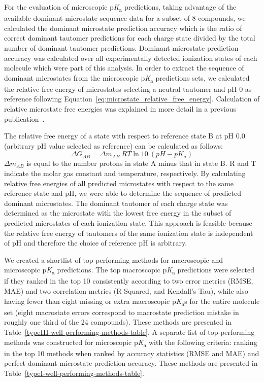 \documentclass[9pt,lineno,final]{elife}
\newcommand{\pKa}{p\textit{K}\textsubscript{a}}
\begin{document}
For the evaluation of microscopic \pKa{} predictions, taking advantage of the available dominant microstate sequence data for a subset of 8 compounds, we calculated the dominant microstate prediction accuracy which is the ratio of correct dominant tautomer predictions for each charge state divided by the total number of dominant tautomer predictions. 
Dominant microstate prediction accuracy was calculated over all experimentally detected ionization states of each molecule which were part of this analysis. 
In order to extract the sequence of dominant microstates from the microscopic \pKa{} predictions sets, we calculated the relative free energy of microstates selecting a neutral tautomer and pH 0 as reference following Equation~\ref{eq:microstate_relative_free_energy}. 
Calculation of relative microstate free energies was explained in more detail in a previous publication~\citep{Gunner:2020:J.Comput.AidedMol.Des.}. 

The relative free energy of a state with respect to reference state B at pH 0.0 (arbitrary pH value selected as reference) can be calculated as follows: 
\begin{equation}
\Delta G_{AB} = \Delta m_{AB} \:RT\ln{10}\:(pH - pK_{a})
\label{eq:microstate_relative_free_energy}
\end{equation}
$\Delta m_{AB}$ is equal to the number protons in state A minus that in state B. R and T indicate the molar gas constant and temperature, respectively. 
By calculating relative free energies of all predicted microstates with respect to the same reference state and pH, we were able to determine the sequence of predicted dominant microstates. 
The dominant tautomer of each charge state was determined as the microstate with the lowest free energy in the subset of predicted microstates of each ionization state. 
This approach is feasible because the relative free energy of tautomers of the same ionization state is independent of pH and therefore the choice of reference pH is arbitrary.

We created a shortlist of top-performing methods for macroscopic and microscopic \pKa{} predictions. 
The top macroscopic \pKa{} predictions were selected if they ranked in the top 10 consistently according to two error metrics (RMSE, MAE) and two correlation metrics (R-Squared, and Kendall’s Tau), while also having fewer than eight missing or extra macroscopic \pKa{}s for the entire molecule set (eight macrostate errors correspond to macrostate prediction mistake in roughly one third of the 24 compounds). 
These methods are presented in Table~\ref{typeIII-well-performing-methods-table}. A separate list of top-performing methods was constructed for microscopic \pKa{} with the following criteria: ranking in the top 10 methods when ranked by accuracy statistics (RMSE and MAE) and perfect dominant microstate prediction accuracy. 
These methods are presented in Table~\ref{typeI-well-performing-methods-table}.
\end{document}
